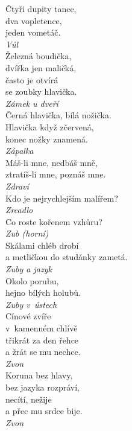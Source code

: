 \begin{multicols}{\value{columnsthindata}}
\noindent
Čtyři dupity tance,\\
dva vopletence,\\
jeden vometáč.\\[1 mm]
{\sl Vůl}\\

\noindent
Železná boudička,\\
dvířka jen maličká,\\
často je otvírá\\
se zoubky hlavička.\\[1 mm]
{\sl Zámek u dveří}\\

\noindent
Černá hlavička, bílá nožička.\\
Hlavička když zčervená,\\
konec nožky znamená.\\[1 mm]
{\sl Zápalka}\\

\noindent
Máš-li mne, nedbáš mně,\\
ztratíš-li mne, poznáš mne.\\[1 mm]
{\sl Zdraví}\\

\noindent
Kdo je nejrychlejším malířem?\\[1 mm]
{\sl Zrcadlo}\\

\noindent
Co roste kořenem vzhůru?\\[1 mm]
{\sl Zub (horní)}\\

\noindent
Skálami chléb drobí\\
a metličkou do studánky zametá.\\[1 mm]
{\sl Zuby a jazyk}\\

\noindent
Okolo porubu,\\
hejno bílých holubů.\\[1 mm]
{\sl Zuby v~ústech}\\

\noindent
Cínové zvíře\\
v~kamenném chlívě\\
třikrát za den řehce\\
a žrát se mu nechce.\\[1 mm]
{\sl Zvon}\\

\noindent
Koruna bez hlavy,\\
bez jazyka rozpráví,\\
necítí, nežije\\
a přec mu srdce bije.\\[1 mm]
{\sl Zvon}\\


\end{multicols}
